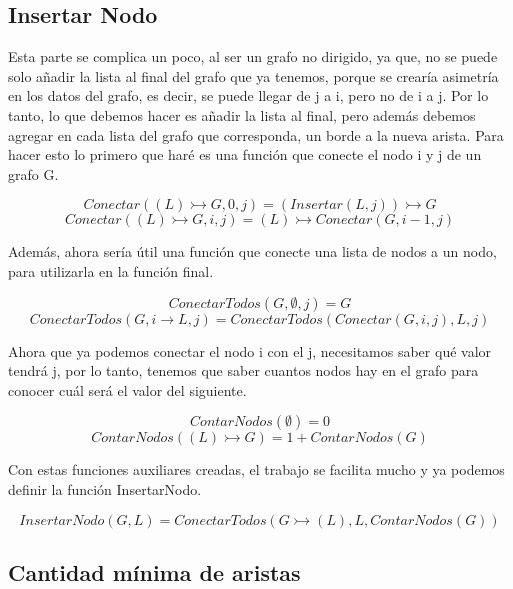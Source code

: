 \documentclass[../doc.tex]{subfiles}
\begin{document}
\begin{center}
\end{center}

\subsection{Insertar Nodo}
Esta parte se complica un poco, al ser un grafo no dirigido, ya que, no se puede
solo añadir la lista al final del grafo que ya tenemos, porque se crearía 
asimetría en los datos del grafo, es decir, se puede llegar de j a i, pero 
no de i a j.
Por lo tanto, lo que debemos hacer es añadir la lista al final, pero además 
debemos agregar en cada lista del grafo que corresponda, un borde a la nueva 
arista.
Para hacer esto lo primero que haré es una función que conecte el nodo i y j
de un grafo G.

\[ Conectar((L) \rightarrowtail G, 0, j) = (Insertar(L, j)) \rightarrowtail G \]
\[ Conectar((L) \rightarrowtail G, i, j) = (L) \rightarrowtail Conectar(G, i-1, j) \]

Además, ahora sería útil una función que conecte una lista de nodos a un nodo,
para utilizarla en la función final.

\[ ConectarTodos(G, \emptyset, j) = G  \]
\[ ConectarTodos(G, i \rightarrow L, j) = ConectarTodos(Conectar(G, i, j), L, j)  \]

Ahora que ya podemos conectar el nodo i con el j, necesitamos saber qué valor 
tendrá j, por lo tanto, tenemos que saber cuantos nodos hay en el grafo para 
conocer cuál será el valor del siguiente.

\[ ContarNodos(\emptyset) = 0 \]
\[ ContarNodos((L) \rightarrowtail G) = 1 + ContarNodos(G) \]

Con estas funciones auxiliares creadas, el trabajo se facilita mucho y ya 
podemos definir la función InsertarNodo.

\[ InsertarNodo(G, L) = ConectarTodos(G \rightarrowtail (L), L, ContarNodos(G)) \]

\subsection{Cantidad mínima de aristas}
\end{document}
